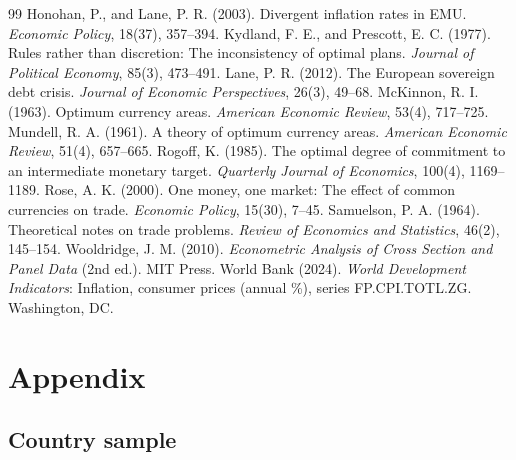 \documentclass[11pt,a4paper]{article}
\numberwithin{equation}{section}
\theoremstyle{definition}
\theoremstyle{remark}
\begin{document}
\begin{thebibliography}{99}
 Honohan, P., and Lane, P. R. (2003). Divergent inflation rates in EMU. \textit{Economic Policy}, 18(37), 357--394.
 Kydland, F. E., and Prescott, E. C. (1977). Rules rather than discretion: The inconsistency of optimal plans. \textit{Journal of Political Economy}, 85(3), 473--491.
 Lane, P. R. (2012). The European sovereign debt crisis. \textit{Journal of Economic Perspectives}, 26(3), 49--68.
 McKinnon, R. I. (1963). Optimum currency areas. \textit{American Economic Review}, 53(4), 717--725.
 Mundell, R. A. (1961). A theory of optimum currency areas. \textit{American Economic Review}, 51(4), 657--665.
 Rogoff, K. (1985). The optimal degree of commitment to an intermediate monetary target. \textit{Quarterly Journal of Economics}, 100(4), 1169--1189.
 Rose, A. K. (2000). One money, one market: The effect of common currencies on trade. \textit{Economic Policy}, 15(30), 7--45.
 Samuelson, P. A. (1964). Theoretical notes on trade problems. \textit{Review of Economics and Statistics}, 46(2), 145--154.
 Wooldridge, J. M. (2010). \textit{Econometric Analysis of Cross Section and Panel Data} (2nd ed.). MIT Press.
 World Bank (2024). \textit{World Development Indicators}: Inflation, consumer prices (annual \%), series FP.CPI.TOTL.ZG. Washington, DC.
\end{thebibliography}

\clearpage
\appendix
\section{Appendix}

\subsection{Country sample}

\end{document}

